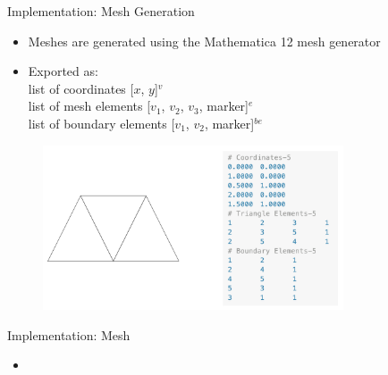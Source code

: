 \documentclass{beamer}
\begin{document}
\begin{frame}{Implementation: Mesh Generation}
\begin{itemize}
    \item Meshes are generated using the Mathematica 12 mesh generator
    \item Exported as:\\ list of coordinates [$x$, $y$]$^v$ \\list of mesh elements [$v_1$, $v_2$, $v_3$, marker]$^{e}$ \\list of boundary elements [$v_1$, $v_2$, marker]$^{be}$
\end{itemize}


\begin{figure}
    \centering
    \includegraphics[width=3.5in]{meshdemo.png}
\end{figure}
    
\end{frame}
\begin{frame}{Implementation: Mesh}
    \begin{itemize}
        \item
    \end{itemize}
\end{frame}
\end{document}
